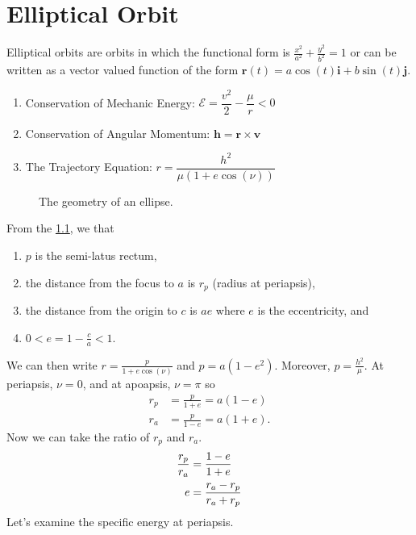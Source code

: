 \hypersetup{pageanchor = false}
\chapter{Elliptical Orbit}
\label{elliptical-orbit}

Elliptical orbits are orbits in which the functional form is
\(\frac{x^2}{a^2} + \frac{y^2}{b^2} = 1\) or can be written as a vector valued
function of the form
\(\mathbf{r}(t) = a\cos(t)\mathbf{i} + b\sin(t)\mathbf{j}\).
\begin{enumerate}[label = \arabic*.]
\item
  Conservation of Mechanic Energy:
  \(\mathcal{E} = \dfrac{v^2}{2} - \dfrac{\mu}{r} < 0\)
\item
  Conservation of Angular Momentum:
  \(\mathbf{h} = \mathbf{r}\times\mathbf{v}\)
\item
  The Trajectory Equation: \(r = \dfrac{h^2}{\mu(1 + e\cos(\nu))}\)
\end{enumerate}
\begin{figure}
  \centering
  
  \caption[Geometry of an Ellipse]{The geometry of an ellipse.}
  \label{geometryellipse}
\end{figure}
From the \cref{geometryellipse}, we that 
\begin{enumerate}[resume*]
\item
  \(p\) is the semi-latus rectum,
\item
  the distance from the focus to \(a\) is \(r_p\) (radius at periapsis),
\item
  the distance from the origin to \(c\) is \(ae\) where \(e\) is the
  eccentricity, and
\item
  \(0 < e = 1 - \frac{c}{a} < 1\).
\end{enumerate}
We can then write \(r = \frac{p}{1 + e\cos(\nu)}\) and \(p = a(1 - e^2)\).
Moreover, \(p = \frac{h^2}{\mu}\).
At periapsis, \(\nu = 0\), and at apoapsis, \(\nu = \pi\) so
\begin{align}
  r_p & = \frac{p}{1 + e} = a(1 - e)\\
  r_a & = \frac{p}{1 - e} = a(1 + e).\label{rpra}
\end{align}
Now we can take the ratio of \(r_p\) and \(r_a\).
\begin{align} 
  \frac{r_p}{r_a} & = \frac{1 - e}{1 + e}\notag\\
  e & = \frac{r_a - r_p}{r_a + r_p}\label{eccinrpra}
\end{align}
Let's examine the specific energy at periapsis.
